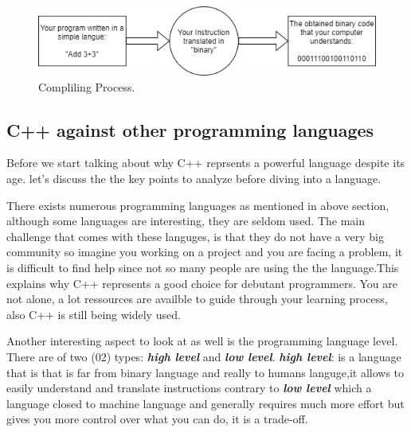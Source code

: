 \documentclass[11pt, a4paper]{article}
\begin{document}
\begin{figure}[h!]
\includegraphics[width = \linewidth]{diagrams/compling.png}
\caption{Compliling Process.}
\label{fig:Compliling Process}
\end{figure}

\subsection{C++ against other programming languages}
Before we start talking about why C++ reprsents a powerful language despite its age. let's discuss the
the key points to analyze before diving into a language.

There exists numerous programming languages as mentioned in above section, although some languages are interesting, 
they are seldom used. The main challenge that comes with these languges, is that they do not have a very big community 
so imagine you working on a project and you are facing a problem, it is difficult to find help since not so many people 
are using the the language.This explains why C++ represents a good choice for debutant programmers. You are not alone, a lot
ressources are availble to guide through your learning process, also C++ is still being widely used.

Another interesting aspect to look at as well is the programming language level. There are of two (02)
types: \textbf{\textit{{high level}}} and \textbf{\textit{{low level}}}.
\newline
\textbf{\textit{{high level}}}: is a language that is that is far from binary language and really
to humans languge,it allows to easily understand and translate instructions contrary to \textbf{\textit{{low level}}}
which a language closed to machine language and generally requires much more effort but gives you more 
control over what you can do, it is a trade-off.
\end{document}
